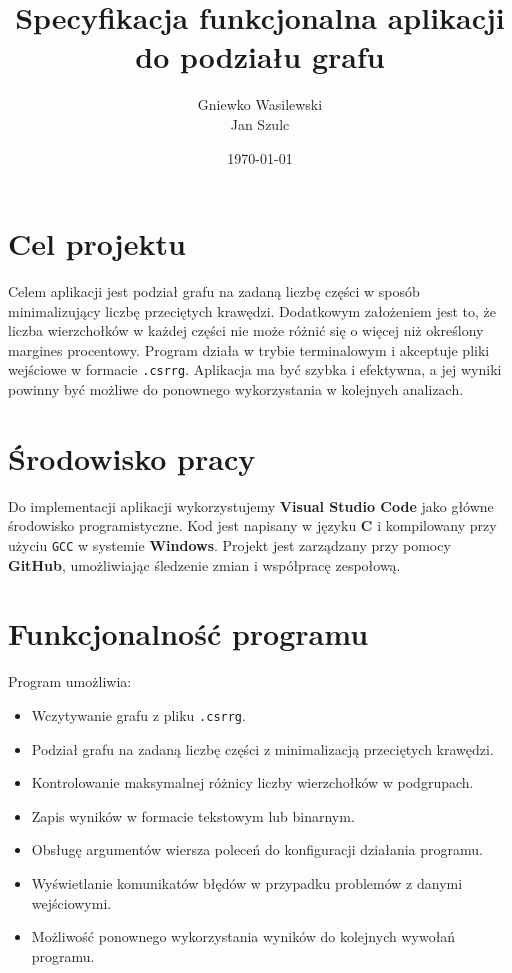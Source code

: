\documentclass{article}
\title{Specyfikacja funkcjonalna aplikacji do podziału grafu}
\author{Gniewko Wasilewski\\Jan Szulc}
\date{\today}
\begin{document}
\maketitle

\section{Cel projektu}
Celem aplikacji jest podział grafu na zadaną liczbę części w sposób minimalizujący liczbę przeciętych krawędzi. Dodatkowym założeniem jest to, że liczba wierzchołków w każdej części nie może różnić się o więcej niż określony margines procentowy. Program działa w trybie terminalowym i akceptuje pliki wejściowe w formacie \texttt{.csrrg}. Aplikacja ma być szybka i efektywna, a jej wyniki powinny być możliwe do ponownego wykorzystania w kolejnych analizach.

\section{Środowisko pracy}
Do implementacji aplikacji wykorzystujemy \textbf{Visual Studio Code} jako główne środowisko programistyczne. Kod jest napisany w języku \textbf{C} i kompilowany przy użyciu \texttt{GCC} w systemie \textbf{Windows}. Projekt jest zarządzany przy pomocy \textbf{GitHub}, umożliwiając śledzenie zmian i współpracę zespołową. 

\section{Funkcjonalność programu}
Program umożliwia:
\begin{itemize}
    \item Wczytywanie grafu z pliku \texttt{.csrrg}.
    \item Podział grafu na zadaną liczbę części z minimalizacją przeciętych krawędzi.
    \item Kontrolowanie maksymalnej różnicy liczby wierzchołków w podgrupach.
    \item Zapis wyników w formacie tekstowym lub binarnym.
    \item Obsługę argumentów wiersza poleceń do konfiguracji działania programu.
    \item Wyświetlanie komunikatów błędów w przypadku problemów z danymi wejściowymi.
    \item Możliwość ponownego wykorzystania wyników do kolejnych wywołań programu.
\end{itemize}
\end{document}
